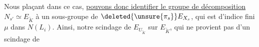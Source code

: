 Nous plaçant dans ce cas, \uline{ pouvons donc identifier le groupe de décomposition} $N_{s'}\simeq E_{\widetilde K}$ à un sous-groupe de $\deleted{\unsure{\pi_s}}E_{X_s}$,  qui est d'indice fini $\mu$ dans  $N(L_i)$. Ainsi, notre scindage de  $E_{U_{\widetilde K}}$  sur $E_{\widetilde K}$, qui ne provient pas d'un scindage de
